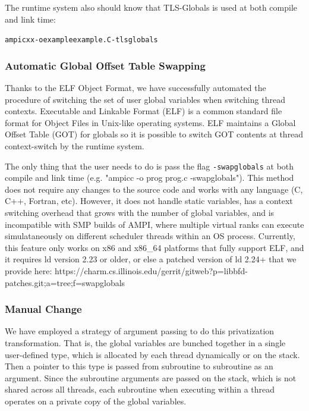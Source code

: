 \documentclass[10pt]{article}
\begin{document}
The runtime system also should know that TLS-Globals is used at both compile and link time:

\begin{alltt}
ampicxx -o example example.C -tlsglobals
\end{alltt}

\subsubsection{Automatic Global Offset Table Swapping}
Thanks to the ELF Object Format, we have successfully automated the procedure 
of switching the set of user global variables when switching thread contexts.
Executable and Linkable Format (ELF) is a common standard file format 
for Object Files in Unix-like operating systems.
ELF maintains a Global Offset Table (GOT) for globals so it is possible to
switch GOT contents at thread context-switch by the runtime system.

The only thing that the user needs to do is pass the flag {\tt -swapglobals}
at both compile and link time (e.g. "ampicc -o prog prog.c -swapglobals"). This method does not require
any changes to the source code and works with any language (C, C++, Fortran, etc).
However, it does not handle static variables, has a context switching
overhead that grows with the number of global variables, and is incompatible with SMP builds
of AMPI, where multiple virtual ranks can execute simulataneously on different scheduler threads
within an OS process.
Currently, this feature only works on x86 and x86\_64 platforms that fully support ELF,
and it requires ld version 2.23 or older, or else a patched version of ld 2.24+ that we provide
here: https://charm.cs.illinois.edu/gerrit/gitweb?p=libbfd-patches.git;a=tree;f=swapglobals

\subsubsection{Manual Change}
We have employed a strategy of argument passing to do this privatization
transformation. That is, the global variables are bunched together in a
single user-defined type, which is allocated by each thread dynamically or on the stack.
Then a pointer to this type is passed from subroutine to subroutine as an argument.
Since the subroutine arguments are passed on the stack, which is not shared
across all threads, each subroutine when executing within a thread operates on
a private copy of the global variables. 
\end{document}
